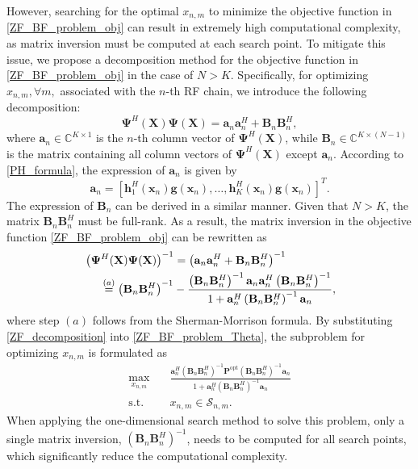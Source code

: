 However, searching for the optimal $x_{n,m}$ to minimize the objective function in \eqref{ZF_BF_problem_obj} can result in extremely high computational complexity, as matrix inversion must be computed at each search point.  To mitigate this issue, we propose a decomposition method for the objective function in \eqref{ZF_BF_problem_obj} in the case of $N > K$. Specifically, for optimizing $x_{n,m}, \forall m,$ associated with the $n$-th RF chain, we introduce the following decomposition:  
\begin{equation}
    \mathbf{\Psi}^H(\mathbf{X}) \mathbf{\Psi}(\mathbf{X}) = \mathbf{a}_n \mathbf{a}_n^H + \mathbf{B}_n \mathbf{B}_n^H, 
\end{equation}  
where $\mathbf{a}_n \in \mathbb{C}^{K \times 1}$ is the $n$-th column vector of $\mathbf{\Psi}^H(\mathbf{X})$, while $\mathbf{B}_n \in \mathbb{C}^{K \times (N-1)}$ is the matrix containing all column vectors of $\mathbf{\Psi}^H(\mathbf{X})$ except $\mathbf{a}_n$. According to \eqref{PH_formula}, the expression of $\mathbf{a}_n$ is given by 
\begin{equation}
    \mathbf{a}_n = \left[ \mathbf{h}_1^H(\mathbf{x}_n)\mathbf{g}(\mathbf{x}_n),\dots,\mathbf{h}_K^H(\mathbf{x}_n)\mathbf{g}(\mathbf{x}_n) \right]^T.
\end{equation} 
The expression of $\mathbf{B}_n$  can be derived in a similar manner. Given that $N > K$, the matrix $\mathbf{B}_n \mathbf{B}_n^H$ must be full-rank. As a result, the matrix inversion in the objective function \eqref{ZF_BF_problem_obj} can be rewritten as 
\begin{align} \label{ZF_decomposition}
    &\left( \mathbf{\Psi}^H(\mathbf{X}) \mathbf{\Psi}(\mathbf{X}) \right)^{-1} = \left( \mathbf{a}_n \mathbf{a}_n^H + \mathbf{B}_n \mathbf{B}_n^H \right)^{-1} \nonumber \\
    &\hspace{0.5cm} \overset{(a)}{=} \left(\mathbf{B}_n \mathbf{B}_n^H\right)^{-1} -  \frac{\left(\mathbf{B}_n \mathbf{B}_n^H\right)^{-1} \mathbf{a}_n \mathbf{a}_n^H \left(\mathbf{B}_n \mathbf{B}_n^H\right)^{-1}}{1 + \mathbf{a}_n^H \left(\mathbf{B}_n \mathbf{B}_n^H\right)^{-1} \mathbf{a}_n},
\end{align} 
where step $(a)$ follows from the Sherman-Morrison formula. By substituting \eqref{ZF_decomposition} into \eqref{ZF_BF_problem_Theta}, the subproblem for optimizing $x_{n,m}$ is formulated as
\begin{subequations} \label{ZF_search_problem}
    \begin{align}
        \max_{x_{n,m}} \quad & \frac{ \mathbf{a}_n^H \left(\mathbf{B}_n \mathbf{B}_n^H\right)^{-1} \mathbf{P}^{\mathrm{opt}} \left(\mathbf{B}_n \mathbf{B}_n^H\right)^{-1} \mathbf{a}_n}{1 + \mathbf{a}_n^H \left(\mathbf{B}_n \mathbf{B}_n^H\right)^{-1} \mathbf{a}_n} \\
        \mathrm{s.t.} \quad & x_{n,m} \in \mathcal{S}_{n,m}.
    \end{align}
\end{subequations}
When applying the one-dimensional search method to solve this problem, only a single matrix inversion, $\left(\mathbf{B}_n \mathbf{B}_n^H\right)^{-1}$, needs to be computed for all search points, which significantly reduce the computational complexity.  


